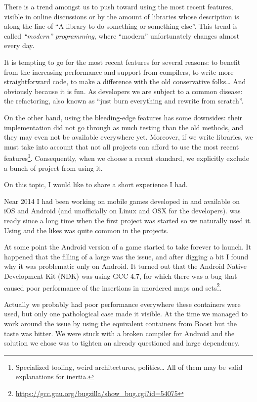 There is a trend amongst us to push toward using the most recent
features, visible in online discussions or by the amount of libraries
whose description is along the line of ``A  library to do
something or something else''. This trend is called \emph{``modern''
  \cpp{} programming}, where ``modern'' unfortunately changes almost
every day.

It is tempting to go for the most recent features for several reasons:
to benefit from the increasing performance and support from compilers,
to write more straightforward code, to make a difference with the old
conservative folks… And obviously because it is fun. As developers we
are subject to a common disease: the refactoring, also known as ``just
burn everything and rewrite from scratch''.

On the other hand, using the bleeding-edge features has some
downsides: their implementation did not go through as much testing
than the old methods, and they may even not be available everywhere
yet. Moreover, if we write libraries, we must take into account that
not all projects can afford to use the most recent
features\footnote{Specialized tooling, weird architectures, politics…
  All of them may be valid explanations for inertia.}. Consequently,
when we choose a recent standard, we explicitly exclude a bunch of
project from using it.

On this topic, I would like to share a short experience I had.

\bigskip

Near 2014 I had been working on mobile games developed in \cpp{} and
available on iOS and Android (and unofficially on Linux and OSX for
the developers).  was ready since a long time when the first
project was started so we naturally used it. Using
 and the likes was quite common in the
projects.

At some point the Android version of a game started to take forever to
launch. It happened that the filling of a large
 was the issue, and after digging a bit I
found why it was problematic only on Android. It turned out that the
Android Native Development Kit (NDK) was using GCC 4.7, for which
there was a bug that caused poor performance of the insertions in
unordered maps and
sets\footnote{\url{https://gcc.gnu.org/bugzilla/show_bug.cgi?id=54075}}.

Actually we probably had poor performance everywhere these
containers were used, but only one pathological case made it
visible. At the time we managed to work around the issue by using the
equivalent containers from Boost but the taste was bitter. We were
stuck with a broken compiler for Android and the solution we chose was
to tighten an already questioned and large dependency.

